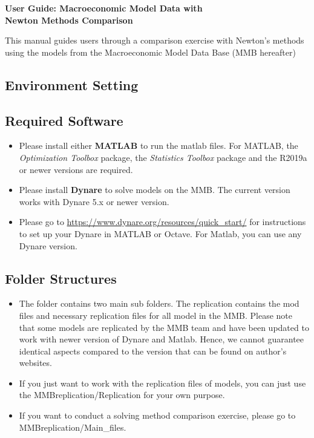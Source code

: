 \documentclass[10pt,a4paper]{article}
\begin{document}
	
	\begin{center}
		\textbf{{\LARGE User Guide: Macroeconomic Model Data with  \\[1em] Newton Methods Comparison }}
	\end{center}
	\bigskip
	This manual guides users through a comparison exercise with Newton's methods using the models from  the Macroeconomic Model Data Base (MMB hereafter)
	\medskip
	
	\begin{flushleft}
		\section{Environment Setting}
	\end{flushleft}
	\medskip
	
	\subsection{Required Software}
	\medskip
	
	\begin{itemize}
		\item Please install either \textbf{MATLAB} to run the matlab files. For MATLAB, the \textit{Optimization Toolbox} package, the \textit{Statistics Toolbox} package and the R2019a or newer versions are required. 
		
		\item Please install \textbf{Dynare} to solve models on the MMB. The current version works with Dynare 5.x or newer version.
		
		\item Please go to \url{https://www.dynare.org/resources/quick_start/} for instructions to set up your Dynare in MATLAB or Octave. For Matlab, you can use any Dynare version.
	\end{itemize}
	
	\subsection{Folder Structures}
	\medskip
	
	\begin{itemize}
		\item The folder contains two main sub folders. The replication contains the mod files and necessary replication files for all model in the MMB. Please note that some models are replicated by the MMB team and have been updated to work with newer version of Dynare and Matlab. Hence, we cannot guarantee identical aspects compared to the version that can be found on author's websites.
		
		\item If you just want to work with the replication files of models, you can just use the MMB\textunderscore replication/Replication for your own purpose.
		
		\item If you want to conduct a solving method comparison exercise, please go to MMB\textunderscore replication/Main\_files.
		
	\end{itemize}
	
\end{document}
